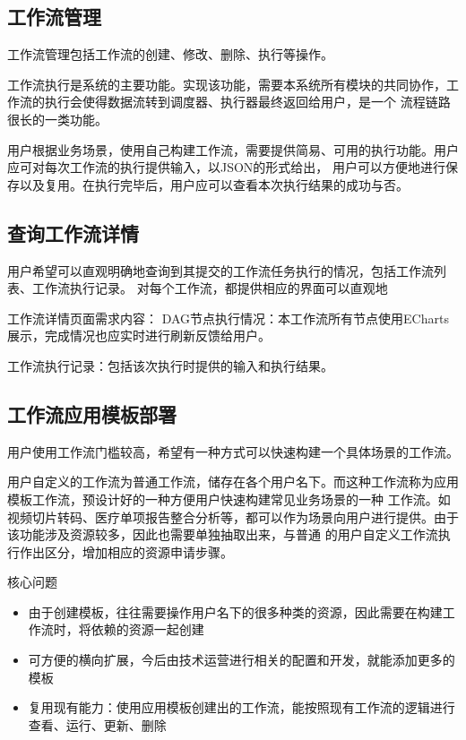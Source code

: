 \subsection{工作流管理}
工作流管理包括工作流的创建、修改、删除、执行等操作。

工作流执行是系统的主要功能。实现该功能，需要本系统所有模块的共同协作，工作流的执行会使得数据流转到调度器、执行器最终返回给用户，是一个
流程链路很长的一类功能。

用户根据业务场景，使用自己构建工作流，需要提供简易、可用的执行功能。用户应可对每次工作流的执行提供输入，以JSON的形式给出，
用户可以方便地进行保存以及复用。在执行完毕后，用户应可以查看本次执行结果的成功与否。



\subsection{查询工作流详情}

用户希望可以直观明确地查询到其提交的工作流任务执行的情况，包括工作流列表、工作流执行记录。
对每个工作流，都提供相应的界面可以直观地

工作流详情页面需求内容：
DAG节点执行情况：本工作流所有节点使用ECharts展示，完成情况也应实时进行刷新反馈给用户。

工作流执行记录：包括该次执行时提供的输入和执行结果。

\subsection{工作流应用模板部署}

用户使用工作流门槛较高，希望有一种方式可以快速构建一个具体场景的工作流。

用户自定义的工作流为普通工作流，储存在各个用户名下。而这种工作流称为应用模板工作流，预设计好的一种方便用户快速构建常见业务场景的一种
工作流。如视频切片转码、医疗单项报告整合分析等，都可以作为场景向用户进行提供。由于该功能涉及资源较多，因此也需要单独抽取出来，与普通
的用户自定义工作流执行作出区分，增加相应的资源申请步骤。


核心问题
\begin{itemize}
    \item 由于创建模板，往往需要操作用户名下的很多种类的资源，因此需要在构建工作流时，将依赖的资源一起创建
    \item 可方便的横向扩展，今后由技术运营进行相关的配置和开发，就能添加更多的模板
    \item 复用现有能力：使用应用模板创建出的工作流，能按照现有工作流的逻辑进行查看、运行、更新、删除
\end{itemize}

